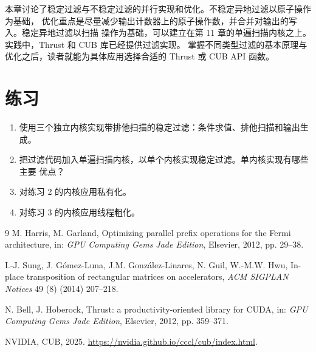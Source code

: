本章讨论了稳定过滤与不稳定过滤的并行实现和优化。不稳定异地过滤以原子操作为基础，
优化重点是尽量减少输出计数器上的原子操作数，并合并对输出的写入。稳定异地过滤以扫描
操作为基础，可以建立在第 11 章的单遍扫描内核之上。实践中，Thrust
\cite{bell2012thrust-filter} 和 CUB\cite{nvidia-cub-filter} 库已经提供过滤实现。
掌握不同类型过滤的基本原理与优化之后，读者就能为具体应用选择合适的 Thrust 或 CUB
API 函数。

\section*{练习}

\begin{enumerate}[label=\arabic*.,leftmargin=2.7em]
  \item 使用三个独立内核实现带排他扫描的稳定过滤：条件求值、排他扫描和输出生成。

  \item 把过滤代码加入单遍扫描内核，以单个内核实现稳定过滤。单内核实现有哪些主要
  优点？

  \item 对练习 2 的内核应用私有化。

  \item 对练习 3 的内核应用线程粗化。
\end{enumerate}

\begin{chapterbibliography}{9}
  M. Harris, M. Garland, Optimizing parallel prefix operations for the Fermi
  architecture, in: \emph{GPU Computing Gems Jade Edition}, Elsevier, 2012,
  pp. 29--38.

  I.-J. Sung, J. G\'omez-Luna, J.M. Gonz\'alez-Linares, N. Guil, W.-M.W. Hwu,
  In-place transposition of rectangular matrices on accelerators,
  \emph{ACM SIGPLAN Notices} 49 (8) (2014) 207--218.

  N. Bell, J. Hoberock, Thrust: a productivity-oriented library for CUDA,
  in: \emph{GPU Computing Gems Jade Edition}, Elsevier, 2012, pp. 359--371.

  NVIDIA, CUB, 2025.
  \url{https://nvidia.github.io/cccl/cub/index.html}.
\end{chapterbibliography}
